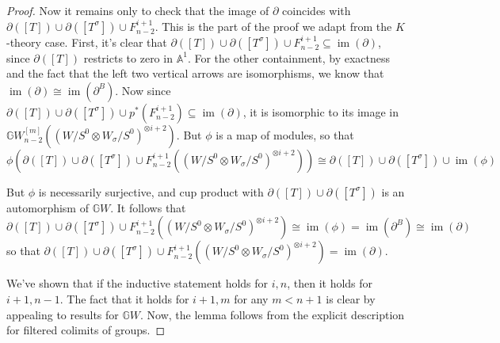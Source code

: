 \documentclass[draftthesis,tocnosub,noragright,centerchapter,10pt]{uiucthesis2009}
\newcommand{\mbb}{\mathbb}
\DeclareMathOperator*{\im}{im}
\theoremstyle{plain}
\theoremstyle{definition}
\begin{document}
\begin{proof}
Now it remains only to
check that the image of $\partial$ coincides with
$\partial([T]) \cup \partial([T^\sigma]) \cup
F^{i+1}_{n-2}$. This is the part of the proof we adapt from the
$K$-theory case. First, it's clear that $\partial([T]) \cup \partial([T^\sigma]) \cup
F^{i+1}_{n-2} \subseteq \im(\partial)$, since $\partial([T])$
restricts to zero in $\mbb A^1$. For the other containment, by
exactness and the fact that the left two vertical arrows are
isomorphisms, we know that $\im(\partial) \cong
\im(\partial^B)$. Now since $\partial([T]) \cup \partial([T^\sigma]) \cup
p^*(F^{i+1}_{n-2}) \subseteq \im(\partial)$, it is isomorphic to its
image in $\mbb GW^{[m]}_{n-2}((W/S^0 \otimes W_\sigma/S^0)^{\otimes
  i+2})$. But $\phi$ is a map of modules, so that 
\[
\phi(\partial([T]) \cup \partial([T^\sigma]) \cup
F^{i+1}_{n-2}((W/S^0 \otimes W_\sigma/S^0)^{\otimes i+2})) \cong \partial([T]) \cup \partial([T^\sigma]) \cup \im(\phi)
\] 

But $\phi$ is necessarily surjective, and cup product with
$ \partial([T]) \cup \partial([T^\sigma])$ is an automorphism of $\mbb
GW$. It follows that 
\[
\partial([T]) \cup \partial([T^\sigma]) \cup
F^{i+1}_{n-2}((W/S^0 \otimes W_\sigma/S^0)^{\otimes i+2}) \cong \im
(\phi) = \im(\partial^B) \cong \im(\partial)
\]
so that $\partial([T]) \cup \partial([T^\sigma]) \cup
F^{i+1}_{n-2}((W/S^0 \otimes W_\sigma/S^0)^{\otimes i+2}) =
\im(\partial)$. 

We've shown that if the inductive statement holds for $i,n$,
then it holds for $i+1,n-1$. The fact that it holds for $i+1,m$ for
any $m < n+1$ is
clear by appealing to results for $\mbb GW$. Now, the lemma follows from the explicit description for filtered
colimits of groups.











\end{proof}
\end{document}
